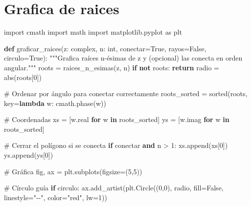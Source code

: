 \documentclass[
  letterpaper,
  DIV=11,
  numbers=noendperiod]{scrreprt}
\newenvironment{Shaded}{\begin{snugshade}}{\end{snugshade}}
\newcommand{\BuiltInTok}[1]{\textcolor[rgb]{0.00,0.23,0.31}{#1}}
\newcommand{\CommentTok}[1]{\textcolor[rgb]{0.37,0.37,0.37}{#1}}
\newcommand{\ControlFlowTok}[1]{\textcolor[rgb]{0.00,0.23,0.31}{\textbf{#1}}}
\newcommand{\DecValTok}[1]{\textcolor[rgb]{0.68,0.00,0.00}{#1}}
\newcommand{\ImportTok}[1]{\textcolor[rgb]{0.00,0.46,0.62}{#1}}
\newcommand{\KeywordTok}[1]{\textcolor[rgb]{0.00,0.23,0.31}{\textbf{#1}}}
\newcommand{\NormalTok}[1]{\textcolor[rgb]{0.00,0.23,0.31}{#1}}
\newcommand{\OperatorTok}[1]{\textcolor[rgb]{0.37,0.37,0.37}{#1}}
\newcommand{\StringTok}[1]{\textcolor[rgb]{0.13,0.47,0.30}{#1}}
\newcommand{\VariableTok}[1]{\textcolor[rgb]{0.07,0.07,0.07}{#1}}
\begin{document}
\section{Grafica de raices}\label{grafica-de-raices}

\begin{Shaded}
\begin{Highlighting}[]
\ImportTok{import}\NormalTok{ cmath}
\ImportTok{import}\NormalTok{ math}
\ImportTok{import}\NormalTok{ matplotlib.pyplot }\ImportTok{as}\NormalTok{ plt}

\KeywordTok{def}\NormalTok{ graficar\_raices(z: }\BuiltInTok{complex}\NormalTok{, n: }\BuiltInTok{int}\NormalTok{, conectar}\OperatorTok{=}\VariableTok{True}\NormalTok{, rayos}\OperatorTok{=}\VariableTok{False}\NormalTok{, circulo}\OperatorTok{=}\VariableTok{True}\NormalTok{):}
    \CommentTok{"""Grafica raíces n{-}ésimas de z y (opcional) las conecta en orden angular."""}
\NormalTok{    roots }\OperatorTok{=}\NormalTok{ raices\_n\_esimas(z, n)}
    \ControlFlowTok{if} \KeywordTok{not}\NormalTok{ roots:}
        \ControlFlowTok{return}
\NormalTok{    radio }\OperatorTok{=} \BuiltInTok{abs}\NormalTok{(roots[}\DecValTok{0}\NormalTok{])}

    \CommentTok{\# Ordenar por ángulo para conectar correctamente}
\NormalTok{    roots\_sorted }\OperatorTok{=} \BuiltInTok{sorted}\NormalTok{(roots, key}\OperatorTok{=}\KeywordTok{lambda}\NormalTok{ w: cmath.phase(w))}

    \CommentTok{\# Coordenadas}
\NormalTok{    xs }\OperatorTok{=}\NormalTok{ [w.real }\ControlFlowTok{for}\NormalTok{ w }\KeywordTok{in}\NormalTok{ roots\_sorted]}
\NormalTok{    ys }\OperatorTok{=}\NormalTok{ [w.imag }\ControlFlowTok{for}\NormalTok{ w }\KeywordTok{in}\NormalTok{ roots\_sorted]}

    \CommentTok{\# Cerrar el polígono si se conecta}
    \ControlFlowTok{if}\NormalTok{ conectar }\KeywordTok{and}\NormalTok{ n }\OperatorTok{\textgreater{}} \DecValTok{1}\NormalTok{:}
\NormalTok{        xs.append(xs[}\DecValTok{0}\NormalTok{])}
\NormalTok{        ys.append(ys[}\DecValTok{0}\NormalTok{])}

    \CommentTok{\# Gráfica}
\NormalTok{    fig, ax }\OperatorTok{=}\NormalTok{ plt.subplots(figsize}\OperatorTok{=}\NormalTok{(}\DecValTok{5}\NormalTok{,}\DecValTok{5}\NormalTok{))}

    \CommentTok{\# Círculo guía}
    \ControlFlowTok{if}\NormalTok{ circulo:}
\NormalTok{        ax.add\_artist(plt.Circle((}\DecValTok{0}\NormalTok{,}\DecValTok{0}\NormalTok{), radio, fill}\OperatorTok{=}\VariableTok{False}\NormalTok{, linestyle}\OperatorTok{=}\StringTok{"{-}{-}"}\NormalTok{, color}\OperatorTok{=}\StringTok{"red"}\NormalTok{, lw}\OperatorTok{=}\DecValTok{1}\NormalTok{))}


\end{Highlighting}
\end{Shaded}
\end{document}
